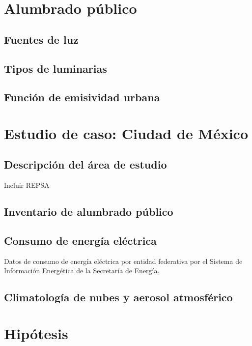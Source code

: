 \section{Alumbrado público}

\subsection{Fuentes de luz}

\subsection{Tipos de luminarias}

\subsection{Función de emisividad urbana}


\section{Estudio de caso: Ciudad de México}

\subsection{Descripción del área de estudio}

Incluir REPSA

\subsection{Inventario de alumbrado público}

\subsection{Consumo de energía eléctrica}

Datos de consumo de energía eléctrica por entidad federativa por el Sistema de Información Energética de la Secretaría de Energía.\\

\subsection{Climatología de nubes y aerosol atmosférico}

\section{Hipótesis}

